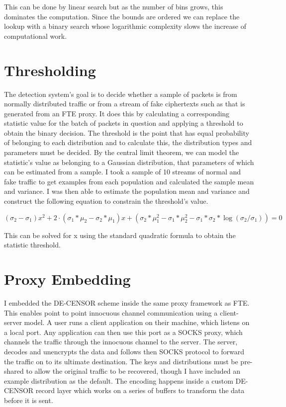 \documentclass[ %
                    author={Samuel Russell},
                supervisor={Prof. Bogdan Warinschi},
                    degree={MEng},
                     title={Innocuous Ciphertexts},
                  subtitle={The DE-CENSOR Scheme},
                      type={research},
                      year={2018} ]{dissertation}
\begin{document}
This can be done by linear search but as the number of bins grows, this dominates the computation.
Since the bounds are ordered we can replace the lookup with a binary search whose logarithmic complexity slows the increase of computational work.

\section{Thresholding}\label{sec:thresholding}

The detection system's goal is to decide whether a sample of packets is from normally distributed traffic or from a stream of fake ciphertexts such as that is generated from an FTE proxy.
It does this by calculating a corresponding statistic value for the batch of packets in question and applying a threshold to obtain the binary decision.
The threshold is the point that has equal probability of belonging to each distribution and to calculate this, the distribution types and parameters must be decided.
By the central limit theorem, we can model the statistic's value as belonging to a Gaussian distribution, that parameters of which can be estimated from a sample.
I took a sample of 10 streams of normal and fake traffic to get examples from each population and calculated the sample mean and variance. I was then able to estimate the population mean and variance and construct the following equation to constrain the threshold's value.

$$(\sigma_2-\sigma_1) x^2 + 2\cdot (\sigma_1*\mu_2 - \sigma_2*\mu_1) x +  (\sigma_2*\mu_1^2 - \sigma_1*\mu_2^2 - \sigma_1*\sigma_2*\log(\sigma_2/\sigma_1)) = 0$$

This can be solved for x using the standard quadratic formula to obtain the statistic threshold.

\section{Proxy Embedding}

I embedded the DE-CENSOR scheme inside the same proxy framework as FTE.
This enables point to point innocuous channel communication using a client-server model.
A user runs a client application on their machine, which listens on a local port.
Any application can then use this port as a SOCKS proxy, which channels the traffic through the innocuous channel to the server.
The server, decodes and unencrypts the data and follows then SOCKS protocol to forward the traffic on to its ultimate destination.
The keys and distributions must be pre-shared to allow the original traffic to be recovered, though I have included an example distribution as the default.
The encoding happens inside a custom DE-CENSOR record layer which works on a series of buffers to transform the data before it is sent.
\end{document}

